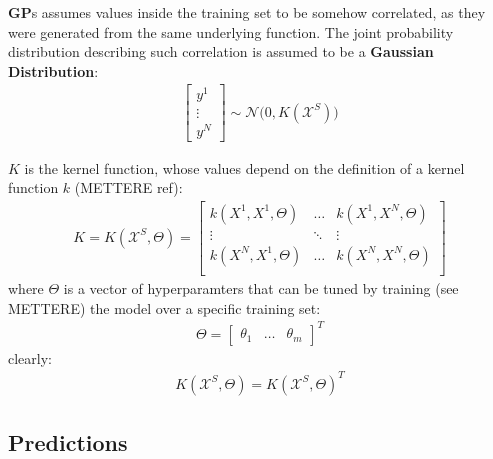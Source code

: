 \documentclass{article}
\begin{document}
\textbf{GP}s assumes values inside the training set to be somehow correlated, as they were generated from the same underlying function.
The joint probability distribution describing such correlation is assumed to be a \textbf{Gaussian Distribution}:
\begin{eqnarray}
\begin{bmatrix} y^1 \\ \vdots \\ y^N \end{bmatrix} \sim \mathcal{N} 
\bigg (
0, K(\mathcal{X}^S)
\bigg ) 
\label{eq:y_joint_distr}
\end{eqnarray}

$K$ is the kernel function, whose values depend on the definition of a kernel function $k$ (METTERE ref):
\begin{eqnarray}
K = K(\mathcal{X}^S, \Theta) = \begin{bmatrix}
k(X^1, X^1, \Theta) & \hdots & k(X^1, X^N, \Theta) \\ 
\vdots & \ddots & \vdots \\ 
k(X^N, X^1, \Theta) & \hdots & k(X^N, X^N, \Theta) \\ 
\end{bmatrix}
\end{eqnarray}
where $\Theta$ is a vector of hyperparamters that can be tuned by training (see METTERE) the model over a specific training set:
\begin{eqnarray}
\Theta = \begin{bmatrix} \theta_1 & \hdots & \theta_m \end{bmatrix} ^ T
\end{eqnarray}
clearly:
\begin{eqnarray}
K(\mathcal{X}^S, \Theta) = K(\mathcal{X}^S, \Theta)^T
\end{eqnarray}

\subsection{Predictions}
\end{document}
